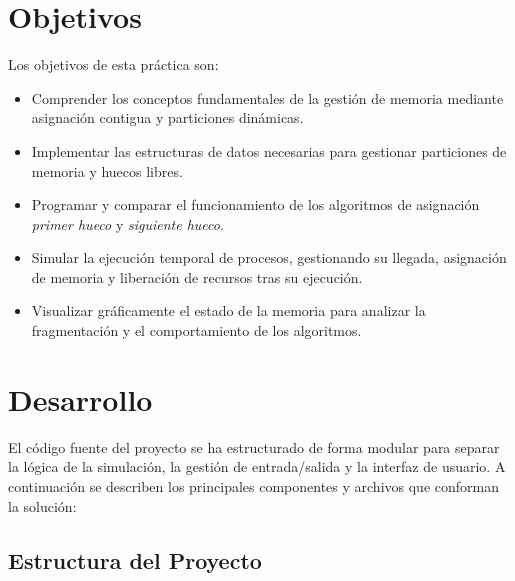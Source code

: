 \documentclass[11pt,a4paper]{article}
\begin{document}
\section{Objetivos}

Los objetivos de esta práctica son:

\begin{itemize}
    \item Comprender los conceptos fundamentales de la gestión de memoria mediante asignación contigua y particiones dinámicas.
    \item Implementar las estructuras de datos necesarias para gestionar particiones de memoria y huecos libres.
    \item Programar y comparar el funcionamiento de los algoritmos de asignación \textit{primer hueco} y \textit{siguiente hueco}.
    \item Simular la ejecución temporal de procesos, gestionando su llegada, asignación de memoria y liberación de recursos tras su ejecución.
    \item Visualizar gráficamente el estado de la memoria para analizar la fragmentación y el comportamiento de los algoritmos.
\end{itemize}

\section{Desarrollo}

El código fuente del proyecto se ha estructurado de forma modular para separar la lógica de la simulación, la gestión de entrada/salida y la interfaz 
de usuario. A continuación se describen los principales componentes y archivos que conforman la solución:

\subsection{Estructura del Proyecto}
\end{document}

